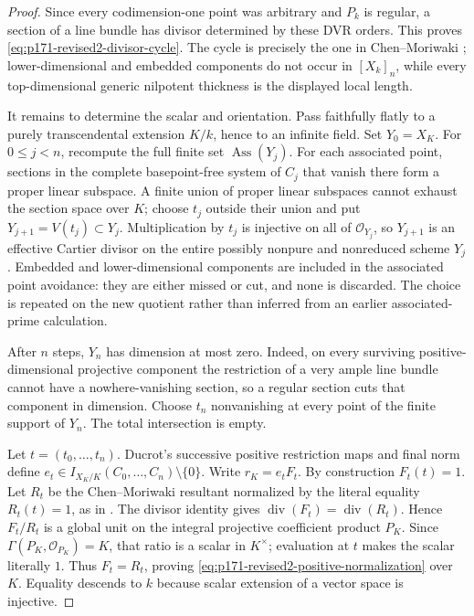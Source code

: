 \begin{proof}
Since every codimension-one point was arbitrary and \(P_k\) is regular, a
section of a line bundle has divisor determined by these DVR orders.  This
proves \eqref{eq:p171-revised2-divisor-cycle}.  The cycle is precisely the
one in Chen--Moriwaki
\cite[Definition~1.6.3]{ChenMoriwaki21AdelicIntersection}; lower-dimensional
and embedded
components do not occur in \([X_k]_n\), while every top-dimensional generic
nilpotent thickness is the displayed local length.

It remains to determine the scalar and orientation.  Pass faithfully flatly
to a purely transcendental extension \(K/k\), hence to an infinite field.
Set \(Y_0=X_K\).  For \(0\leq j<n\), recompute the full finite set
\(\operatorname{Ass}(Y_j)\).  For each associated point, sections in the
complete basepoint-free system of \(C_j\) that vanish there form a proper
linear subspace.  A finite union of proper linear subspaces cannot exhaust
the section space over \(K\); choose \(t_j\) outside their union and put
\(Y_{j+1}=V(t_j)\subset Y_j\).  Multiplication by \(t_j\) is injective on
all of \(\mathcal O_{Y_j}\), so \(Y_{j+1}\) is an effective Cartier
divisor on the entire possibly nonpure and nonreduced scheme \(Y_j\).
Embedded and lower-dimensional components are included in the associated
point avoidance: they are either missed or cut, and none is discarded.
The choice is repeated on the new quotient rather than inferred from an
earlier associated-prime calculation.

After \(n\) steps, \(Y_n\) has dimension at most zero.  Indeed, on every
surviving positive-dimensional projective component the restriction of a
very ample line bundle cannot have a nowhere-vanishing section, so a regular
section cuts that component in dimension.  Choose \(t_n\) nonvanishing at
every point of the finite support of \(Y_n\).  The total intersection is
empty.

Let \(t=(t_0,\ldots,t_n)\).  Ducrot's successive positive restriction maps
and final norm \cite[Sections~6.1--6.2]{Ducrot97CubeIntersection} define
\(e_t\in I_{X_K/K}(C_0,\ldots,C_n)\setminus\{0\}\).  Write
\(r_K=e_tF_t\).  By construction \(F_t(t)=1\).  Let \(R_t\) be the
Chen--Moriwaki resultant normalized by the literal equality \(R_t(t)=1\),
as in \cite[Definition~1.6.7]{ChenMoriwaki21AdelicIntersection}.  The
divisor identity gives
\(\operatorname{div}(F_t)=\operatorname{div}(R_t)\).  Hence
\(F_t/R_t\) is a global unit on the integral projective coefficient product
\(P_K\).  Since \(\Gamma(P_K,\mathcal O_{P_K})=K\), that ratio is a scalar
in \(K^\times\); evaluation at \(t\) makes the scalar literally \(1\).
Thus \(F_t=R_t\), proving
\eqref{eq:p171-revised2-positive-normalization} over \(K\).  Equality
descends to \(k\) because scalar extension of a vector space is injective.


\end{proof}
